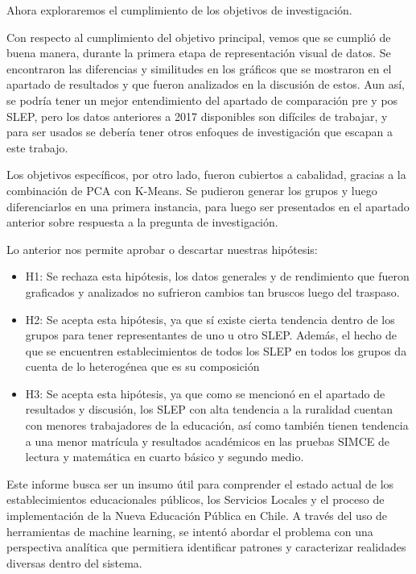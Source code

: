 \documentclass[
  12pt,
  letterpaper,
]{article}
\begin{document}
Ahora exploraremos el cumplimiento de los objetivos de investigación.

Con respecto al cumplimiento del objetivo principal, vemos que se cumplió de buena manera, durante la primera etapa de representación visual de datos.
Se encontraron las diferencias y similitudes en los gráficos que se mostraron en el apartado de resultados y que fueron analizados en la discusión de estos.
Aun así, se podría tener un mejor entendimiento del apartado de comparación pre y pos SLEP, pero los datos anteriores a 2017 disponibles son difíciles de trabajar, y para ser usados se debería tener otros enfoques de investigación que escapan a este trabajo.

Los objetivos específicos, por otro lado, fueron cubiertos a cabalidad, gracias a la combinación de PCA con K-Means.
Se pudieron generar los grupos y luego diferenciarlos en una primera instancia, para luego ser presentados en el apartado anterior sobre respuesta a la pregunta de investigación.

Lo anterior nos permite aprobar o descartar nuestras hipótesis:

\begin{itemize}
\item
  H1: Se rechaza esta hipótesis, los datos generales y de rendimiento que fueron graficados y analizados no sufrieron cambios tan bruscos luego del traspaso.
\item
  H2: Se acepta esta hipótesis, ya que sí existe cierta tendencia dentro de los grupos para tener representantes de uno u otro SLEP.
  Además, el hecho de que se encuentren establecimientos de todos los SLEP en todos los grupos da cuenta de lo heterogénea que es su composición
\item
  H3: Se acepta esta hipótesis, ya que como se mencionó en el apartado de resultados y discusión, los SLEP con alta tendencia a la ruralidad cuentan con menores trabajadores de la educación, así como también tienen tendencia a una menor matrícula y resultados académicos en las pruebas SIMCE de lectura y matemática en cuarto básico y segundo medio.
\end{itemize}

Este informe busca ser un insumo útil para comprender el estado actual de los establecimientos educacionales públicos, los Servicios Locales y el proceso de implementación de la Nueva Educación Pública en Chile.
A través del uso de herramientas de machine learning, se intentó abordar el problema con una perspectiva analítica que permitiera identificar patrones y caracterizar realidades diversas dentro del sistema.
\end{document}

